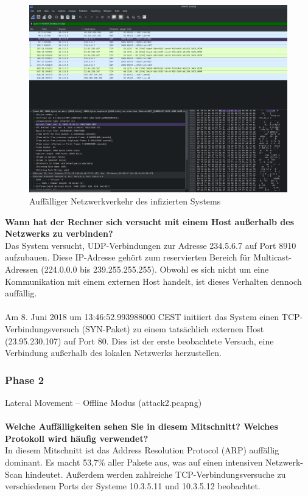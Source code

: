 \documentclass[
    a4paper,
    pagesize,
	pdftex,
    12pt,
]{scrartcl}
\begin{document}
\begin{figure}[H]
    \centering
    \includegraphics[width=\textwidth]{ws-suspicious-traffic.png}
    \caption{Auffälliger Netzwerkverkehr des infizierten Systems}
    \label{fig:ws-suspicious-traffic}
\end{figure}
\textbf{Wann hat der Rechner sich versucht mit einem Host außerhalb des Netzwerks zu verbinden?}
\\
Das System versucht, UDP-Verbindungen zur Adresse 234.5.6.7 auf Port 8910 aufzubauen. Diese IP-Adresse gehört zum reservierten Bereich für Multicast-Adressen (224.0.0.0 bis 239.255.255.255). Obwohl es sich nicht um eine Kommunikation mit einem externen Host handelt, ist dieses Verhalten dennoch auffällig.
\\ \\
Am 8. Juni 2018 um 13:46:52.993988000 CEST initiiert das System einen TCP-Verbindungsversuch (SYN-Paket) zu einem tatsächlich externen Host (23.95.230.107) auf Port 80. Dies ist der erste beobachtete Versuch, eine Verbindung außerhalb des lokalen Netzwerks herzustellen.

\subsubsection{Phase 2}
Lateral Movement – Offline Modus (attack2.pcapng)
\\ \\
\textbf{Welche Auffälligkeiten sehen Sie in diesem Mitschnitt? Welches Protokoll wird häufig verwendet?}
\\
In diesem Mitschnitt ist das Address Resolution Protocol (ARP) auffällig dominant. Es macht 53,7\% aller Pakete aus, was auf einen intensiven Netzwerk-Scan hindeutet. Außerdem werden zahlreiche TCP-Verbindungsversuche zu verschiedenen Ports der Systeme 10.3.5.11 und 10.3.5.12 beobachtet.
\end{document}
